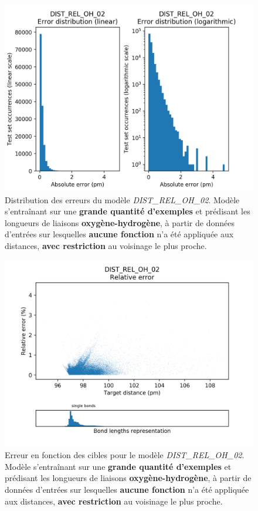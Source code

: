 \begin{figure}[!h]
	\centering
	
	\includegraphics[scale=0.75]{../figures/DIST_REL_OH_02/DIST_REL_OH_02_distrib_rmse_val.png}	
	
	\caption{Distribution des erreurs du modèle \emph{DIST\_REL\_OH\_02}. Modèle s'entraînant sur une \textbf{grande quantité d'exemples} et prédisant les longueurs de liaisons \textbf{oxygène-hydrogène}, à partir de données d'entrées sur lesquelles \textbf{aucune fonction} n'a été appliquée aux distances, \textbf{avec restriction} au voisinage le plus proche.}
\end{figure}
\begin{figure}[!h]
	\centering
	
	\includegraphics[scale=0.75]{../figures/DIST_REL_OH_02/DIST_REL_OH_02_distrib_rmse_dist.png}	
	
	\caption{Erreur en fonction des cibles pour le modèle \emph{DIST\_REL\_OH\_02}. Modèle s'entraînant sur une \textbf{grande quantité d'exemples} et prédisant les longueurs de liaisons \textbf{oxygène-hydrogène}, à partir de données d'entrées sur lesquelles \textbf{aucune fonction} n'a été appliquée aux distances, \textbf{avec restriction} au voisinage le plus proche.}
	\end{figure}


